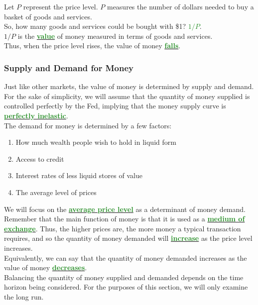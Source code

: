 \documentclass[11pt]{article}\usepackage[]{graphicx}\usepackage[]{color}
\theoremstyle{definition}
\newcommand{\dd}[1]{{\underline{\textbf{\textcolor{ForestGreen}{#1}}}}}
\begin{document}
Let $P$ represent the price level. $P$ measures the number of dollars needed to buy a basket of goods and services.
\\

So, how many goods and services could be bought with \$1? \dd{$1/P$}.
\\

$1/P$ is the \dd{value} of money measured in terms of goods and services.
\\

Thus, when the price level rises, the value of money \dd{falls}.

\subsubsection*{Supply and Demand for Money}

Just like other markets, the value of money is determined by supply and demand.
\\

For the sake of simplicity, we will assume that the quantity of money supplied is controlled perfectly by the Fed, implying that the money supply curve is \dd{perfectly inelastic}.
\\

The demand for money is determined by a few factors:
\begin{enumerate}
	\item How much wealth people wish to hold in liquid form
	\item Access to credit
	\item Interest rates of less liquid stores of value
	\item The average level of prices 
\end{enumerate}

We will focus on the \dd{average price level} as a determinant of money demand.
\\

Remember that the main function of money is that it is used as a \dd{medium of exchange}. Thus, the higher prices are, the more money a typical transaction requires, and so the quantity of money demanded will \dd{increase} as the price level increases.
\\

Equivalently, we can say that the quantity of money demanded increases as the value of money \dd{decreases}.
\\

Balancing the quantity of money supplied and demanded depends on the time horizon being considered. For the purposes of this section, we will only examine the long run. 
\\
\end{document}
